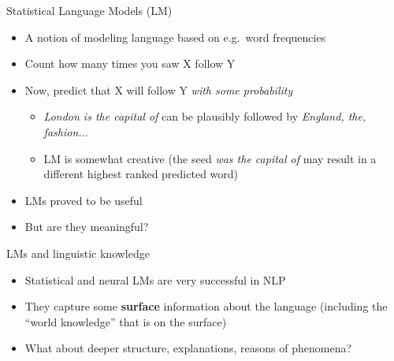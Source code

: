\documentclass{beamer}
\begin{document}
\begin{frame}{Statistical Language Models (LM)}
  \begin{itemize}
  \item A notion of modeling language based on e.g.\ word frequencies
  \item Count how many times you saw X follow Y
  \item Now, predict that X will follow Y {\it with some probability}
    \begin{itemize}
    \item {\it London is the capital of} can be plausibly followed by {\it England, the, fashion...}
    \item LM is somewhat creative (the seed {\it was the capital of} may result in a different highest ranked predicted word)
    \end{itemize}
  \item LMs proved to be useful
  \item But are they meaningful?
  \end{itemize}
\end{frame}

\begin{frame}{LMs and linguistic knowledge}
  \begin{itemize}
  \item Statistical and neural LMs are very successful in NLP
  \item They capture some {\bf surface} information about the language (including the ``world knowledge'' that is on the surface)
  \item What about deeper structure, explanations, reasons of phenomena?
\end{itemize}
\end{frame}
\end{document}

